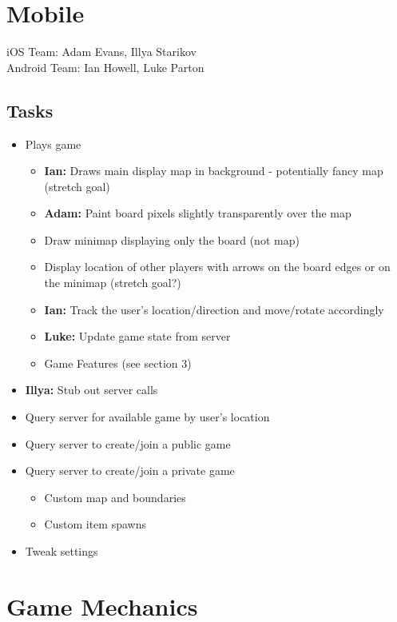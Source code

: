 \documentclass[oneside,12pt]{scrbook}
\begin{document}
\chapter{Mobile}
iOS Team: Adam Evans, Illya Starikov\\
Android Team: Ian Howell, Luke Parton

\section{Tasks}
\begin{itemize}
    \item Plays game
        \begin{itemize}
            \item \textbf{Ian:} Draws main display map in background - potentially fancy map (stretch goal)
            \item \textbf{Adam:} Paint board pixels slightly transparently over the map
            \item Draw minimap displaying only the board (not map)
            \item Display location of other players with arrows on the board edges or on the minimap (stretch goal?)
            \item \textbf{Ian:} Track the user's location/direction and move/rotate accordingly
            \item \textbf{Luke:} Update game state from server
            \item Game Features (see section 3)
        \end{itemize}
    \item \textbf{Illya:} Stub out server calls
    \item Query server for available game by user's location
    \item Query server to create/join a public game
    \item Query server to create/join a private game
        \begin{itemize}
            \item Custom map and boundaries
            \item Custom item spawns
        \end{itemize}
    \item Tweak settings
\end{itemize}


\chapter{Game Mechanics}
\end{document}
